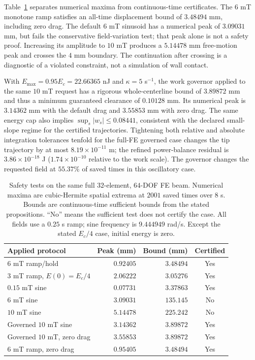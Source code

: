 Table~\ref{tab:unifiedsafety} separates numerical maxima from continuous-time
certificates.  The $6$ mT monotone ramp satisfies an all-time displacement
bound of $3.48494$ mm, including zero drag.  The default $6$ mT sinusoid
has a numerical peak of $3.09031$ mm, but fails the conservative field-variation
test; that peak alone is not a safety proof.  Increasing its amplitude to
$10$ mT produces a $5.14478$ mm free-motion peak and crosses the $4$ mm
boundary.  The continuation after crossing is a diagnostic of a violated
constraint, not a simulation of wall contact.

With $E_{\max}=0.95E_c=22.66365$ nJ and $\kappa=5$ s$^{-1}$,
the work governor applied to the same $10$ mT request has a rigorous
whole-centerline bound of $3.89872$ mm and thus a minimum guaranteed
clearance of $0.10128$ mm.  Its numerical peak is $3.14362$ mm with the
default drag and $3.55853$ mm with zero drag.  The same energy cap also
implies $\sup_s|w_s|\leq0.08441$, consistent with the declared small-slope
regime for the certified trajectories.
Tightening both relative and absolute integration tolerances tenfold
for the full-FE governed case changes the tip trajectory by at most
$8.19\times10^{-11}$ m; the refined power-balance residual is
$3.86\times10^{-18}$ J ($1.74\times10^{-10}$ relative to the work scale).
The governor changes the requested field at $55.37\%$ of saved times
in this oscillatory case.

\begin{table}[t]
\centering
\caption{Safety tests on the same full $32$-element, $64$-DOF FE beam.
Numerical maxima are cubic-Hermite spatial extrema at $2001$ saved times
over $8$ s.  Bounds are continuous-time sufficient bounds from the stated
propositions.  ``No'' means the sufficient test does not certify the case.
All fields use a $0.25$ s ramp; sine frequency is $9.444949$ rad/s.
Except the stated $E_c/4$ case, initial energy is zero.}
\label{tab:unifiedsafety}
\begin{tabular}{lrrc}
\toprule
Applied protocol & Peak (mm) & Bound (mm) & Certified\\
\midrule
$6$ mT ramp/hold & $0.92405$ & $3.48494$ & Yes\\
$3$ mT ramp, $E(0)=E_c/4$ & $2.06222$ & $3.05276$ & Yes\\
$0.15$ mT sine & $0.07731$ & $3.37863$ & Yes\\
$6$ mT sine & $3.09031$ & $135.145$ & No\\
$10$ mT sine & $5.14478$ & $225.242$ & No\\
Governed $10$ mT sine & $3.14362$ & $3.89872$ & Yes\\
Governed $10$ mT, zero drag & $3.55853$ & $3.89872$ & Yes\\
$6$ mT ramp, zero drag & $0.95405$ & $3.48494$ & Yes\\
\bottomrule
\end{tabular}
\end{table}


